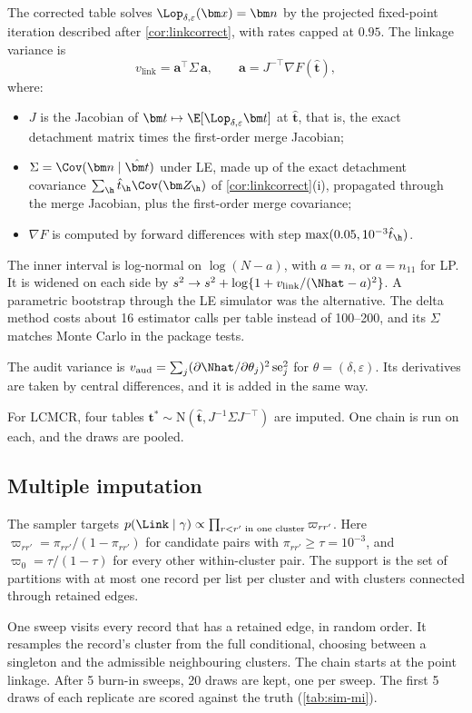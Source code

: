 The corrected table solves $\Lop_{\delta,\varepsilon}(\bm x)=\bm n$ by the projected fixed-point iteration described after \cref{cor:linkcorrect}, with rates capped at $0.95$. The linkage variance is
\[
  v_{\mathrm{link}}=\bm a^{\top}\Sigma\,\bm a,\qquad \bm a=J^{-\top}\nabla F(\hat{\bm t}),
\]
where:
\begin{itemize}
  \item $J$ is the Jacobian of $\bm t\mapsto\E[\Lop_{\delta,\varepsilon}\bm t]$ at $\hat{\bm t}$, that is, the exact detachment matrix times the first-order merge Jacobian;
  \item $\Sigma=\Cov(\bm n\mid\hat{\bm t})$ under LE, made up of the exact detachment covariance $\sum_{\h}\hat t_{\h}\Cov(\bm Z_{\h})$ of \cref{cor:linkcorrect}(i), propagated through the merge Jacobian, plus the first-order merge covariance;
  \item $\nabla F$ is computed by forward differences with step $\max(0.05,10^{-3}\hat t_{\h})$.
\end{itemize}
The inner interval is log-normal on $\log(N-a)$, with $a=n$, or $a=n_{11}$ for LP. It is widened on each side by $s^2\to s^2+\log\{1+v_{\mathrm{link}}/(\Nhat-a)^2\}$. A parametric bootstrap through the LE simulator was the alternative. The delta method costs about 16 estimator calls per table instead of 100--200, and its $\Sigma$ matches Monte Carlo in the package tests.

The audit variance is $v_{\mathrm{aud}}=\sum_j(\partial\Nhat/\partial\theta_j)^2\,\mathrm{se}_j^2$ for $\theta=(\delta,\varepsilon)$. Its derivatives are taken by central differences, and it is added in the same way.

For LCMCR, four tables $\bm t^\ast\sim\mathrm N(\hat{\bm t},J^{-1}\Sigma J^{-\top})$ are imputed. One chain is run on each, and the draws are pooled.

\subsection{Multiple imputation}\label{app:sim-mi}

The sampler targets $p(\Link\mid\gamma)\propto\prod_{r<r'\text{ in one cluster}}\varpi_{rr'}$. Here $\varpi_{rr'}=\pi_{rr'}/(1-\pi_{rr'})$ for candidate pairs with $\pi_{rr'}\ge\tau=10^{-3}$, and $\varpi_0=\tau/(1-\tau)$ for every other within-cluster pair. The support is the set of partitions with at most one record per list per cluster and with clusters connected through retained edges.

One sweep visits every record that has a retained edge, in random order. It resamples the record's cluster from the full conditional, choosing between a singleton and the admissible neighbouring clusters. The chain starts at the point linkage. After 5 burn-in sweeps, 20 draws are kept, one per sweep. The first 5 draws of each replicate are scored against the truth (\cref{tab:sim-mi}).

